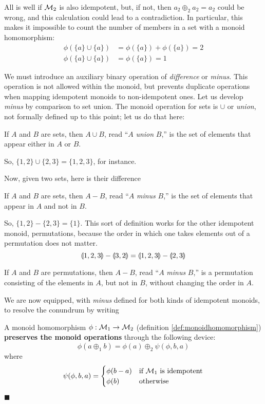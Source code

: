 All is well if $\mathcal{M}_{2}$ is also idempotent, but, if not, then $a_2\oplus_2 a_2=a_2$ could be wrong, and this calculation could lead to a contradiction. In particular, this makes it impossible to count the number of members in a set with a monoid homomorphism:
\begin{align*}
  \phi\left(\{a\}\cup\{a\}\right)&=\phi\left(\{a\}\right)+\phi\left(\{a\}\right)=2\\
  \phi\left(\{a\}\cup\{a\}\right)&=\phi\left(\{a\}\right)=1
\end{align*}


We must introduce an auxiliary binary operation of \emph{difference} or \emph{minus}. This operation is not allowed within the monoid, but prevents duplicate operations when mapping idempotent monoids to non-idempotent ones. Let us develop \emph{minus} by comparison to set union. The monoid operation for sets is $\cup$ or \emph{union}, not formally defined up to this point; let us do that here:
\begin{definition}
  If $A$ and $B$ are sets, then $A\cup B$, read ``$A$ \emph{union} $B$,'' is the set of elements that appear either in $A$ or $B$.
\end{definition}
So, $\{1,2\} \cup \{2,3\}=\{1,2,3\}$, for instance.


Now, given two sets, here is their difference
\begin{definition}
  If $A$ and $B$ are sets, then $A-B$, read ``$A$ \emph{minus} $B$,'' is the set of elements that appear in $A$ and not in $B$.
\end{definition}
So, $\{1,2\} - \{2,3\}=\{1\}$. This sort of definition works for the other idempotent monoid, permutations, because the order in which one takes elements out of a permutation does not matter.
\begin{equation*}
  \llparenthesis 1,2,3 \rrparenthesis-\llparenthesis 3,2 \rrparenthesis = \llparenthesis 1,2,3 \rrparenthesis-\llparenthesis 2,3 \rrparenthesis
\end{equation*}


\begin{definition}
  If $A$ and $B$ are permutations, then $A-B$, read ``$A$ \emph{minus} $B$,'' is a permutation consisting of the elements in $A$, but not in $B$, without changing the order in $A$.
\end{definition}


We are now equipped, with \emph{minus} defined for both kinds of idempotent monoids, to resolve the conundrum by writing


\begin{definition} A monoid homomorphism $\phi : \mathcal{M}_{1}\rightarrow\mathcal{M}_{2}$ (definition \ref{def:monoidhomomorphism}) \textbf{preserves the monoid operations} through the following device:
\begin{equation}
  \phi(a \oplus_1 b) = \phi(a)\oplus_2\psi(\phi,b,a)
\end{equation}
where
\begin{equation}
  \psi(\phi,b,a)=
  \begin{cases}
    \phi(b-a) & \text{if $\mathcal{M}_{1}$ is idempotent} \\
    \phi(b)   & \text{otherwise}
  \end{cases}
\end{equation}
\end{definition}
$\blacksquare$


